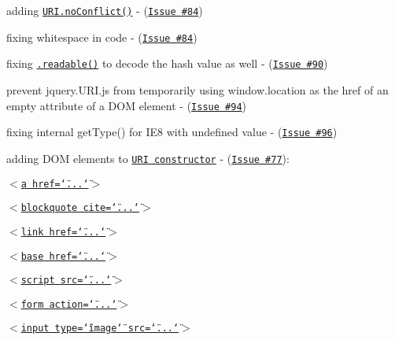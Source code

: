 \begin{DoxyItemize}
\item adding \href{http://medialize.github.io/URI.js/docs.html#static-noConflict}{\tt {\ttfamily U\+R\+I.\+no\+Conflict()}} -\/ (\href{https://github.com/medialize/URI.js/issue/84}{\tt Issue \#84})
\item fixing whitespace in code -\/ (\href{https://github.com/medialize/URI.js/issue/84}{\tt Issue \#84})
\item fixing \href{http://medialize.github.io/URI.js/docs.html#readable}{\tt {\ttfamily .readable()}} to decode the hash value as well -\/ (\href{https://github.com/medialize/URI.js/issue/90}{\tt Issue \#90})
\item prevent {\ttfamily jquery.\+U\+R\+I.\+js} from temporarily using {\ttfamily window.\+location} as the {\ttfamily href} of an empty attribute of a D\+OM element -\/ (\href{https://github.com/medialize/URI.js/issues/94}{\tt Issue \#94})
\item fixing internal {\ttfamily get\+Type()} for I\+E8 with undefined value -\/ (\href{https://github.com/medialize/URI.js/issues/96}{\tt Issue \#96})
\item adding D\+OM elements to \href{http://medialize.github.io/URI.js/docs.html#constructor}{\tt U\+RI constructor} -\/ (\href{https://github.com/medialize/URI.js/issues/77}{\tt Issue \#77})\+:
\begin{DoxyItemize}
\item \href{http://www.w3.org/html/wg/drafts/html/master/text-level-semantics.html#the-a-element}{\tt {\ttfamily $<$a href=\char`\"{}...\char`\"{}$>$}}
\item \href{http://www.w3.org/html/wg/drafts/html/master/grouping-content.html#the-blockquote-element}{\tt {\ttfamily $<$blockquote cite=\char`\"{}...\char`\"{}$>$}}
\item \href{http://www.w3.org/html/wg/drafts/html/master/document-metadata.html#the-link-element}{\tt {\ttfamily $<$link href=\char`\"{}...\char`\"{}$>$}}
\item \href{http://www.w3.org/html/wg/drafts/html/master/document-metadata.html#the-base-element}{\tt {\ttfamily $<$base href=\char`\"{}...\char`\"{}$>$}}
\item \href{http://www.w3.org/html/wg/drafts/html/master/scripting-1.html#script}{\tt {\ttfamily $<$script src=\char`\"{}...\char`\"{}$>$}}
\item \href{http://www.w3.org/html/wg/drafts/html/master/forms.html#the-form-element}{\tt {\ttfamily $<$form action=\char`\"{}...\char`\"{}$>$}}
\item \href{http://www.w3.org/html/wg/drafts/html/master/forms.html#the-input-element}{\tt {\ttfamily $<$input type=\char`\"{}image\char`\"{} src=\char`\"{}...\char`\"{}$>$}}

\end{DoxyItemize}
\end{DoxyItemize}
